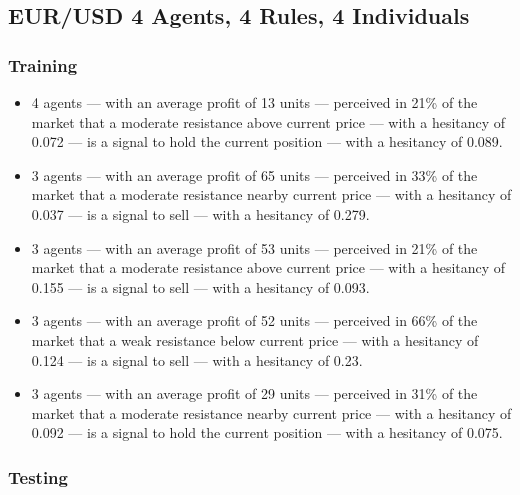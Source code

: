 \subsection{EUR/USD 4 Agents, 4 Rules, 4 Individuals}
\label{}

\subsubsection{Training}
\label{}

{\small
  \begin{itemize}
  \item 4 agents — with an average profit of 13 units — perceived in 21\% of the
    market that a moderate resistance above current price — with a hesitancy of
    0.072 — is a signal to hold the current position — with a hesitancy of
    0.089.
  \item 3 agents — with an average profit of 65 units — perceived in 33\% of the
    market that a moderate resistance nearby current price — with a hesitancy of
    0.037 — is a signal to sell — with a hesitancy of 0.279.
  \item 3 agents — with an average profit of 53 units — perceived in 21\% of the
    market that a moderate resistance above current price — with a hesitancy of
    0.155 — is a signal to sell — with a hesitancy of 0.093.
  \item 3 agents — with an average profit of 52 units — perceived in 66\% of the
    market that a weak resistance below current price — with a hesitancy of
    0.124 — is a signal to sell — with a hesitancy of 0.23.
  \item 3 agents — with an average profit of 29 units — perceived in 31\% of the
    market that a moderate resistance nearby current price — with a hesitancy of
    0.092 — is a signal to hold the current position — with a hesitancy of
    0.075.
  \end{itemize}
}

\subsubsection{Testing}
\label{}

